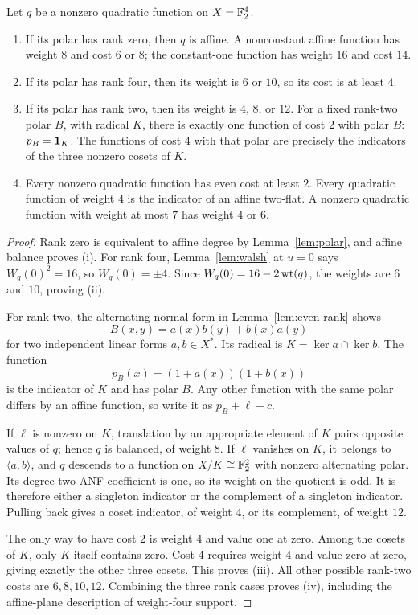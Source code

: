 \begin{lemma}\label{lem:four-costs}
Let $q$ be a nonzero quadratic function on $X=\mathbb F_2^4$.
\begin{enumerate}[label=(\roman*)]
\item If its polar has rank zero, then $q$ is affine. A nonconstant affine function has weight $8$ and cost $6$ or $8$; the constant-one function has weight $16$ and cost $14$.
\item If its polar has rank four, then its weight is $6$ or $10$, so its cost is at least $4$.
\item If its polar has rank two, then its weight is $4$, $8$, or $12$. For a fixed rank-two polar $B$, with radical $K$, there is exactly one function of cost $2$ with polar $B$: $p_B=\mathbf 1_K$. The functions of cost $4$ with that polar are precisely the indicators of the three nonzero cosets of $K$.
\item Every nonzero quadratic function has even cost at least $2$. Every quadratic function of weight $4$ is the indicator of an affine two-flat. A nonzero quadratic function with weight at most $7$ has weight $4$ or $6$.
\end{enumerate}
\end{lemma}
\begin{proof}
Rank zero is equivalent to affine degree by Lemma~\ref{lem:polar}, and affine balance proves (i). For rank four, Lemma~\ref{lem:walsh} at $u=0$ says $W_q(0)^2=16$, so $W_q(0)=\pm4$. Since $W_q(0)=16-2\operatorname{wt}(q)$, the weights are $6$ and $10$, proving (ii).

For rank two, the alternating normal form in Lemma~\ref{lem:even-rank} shows
\[
B(x,y)=a(x)b(y)+b(x)a(y)
\]
for two independent linear forms $a,b\in X^*$. Its radical is $K=\ker a\cap\ker b$. The function
\[
p_B(x)=(1+a(x))(1+b(x))
\]
is the indicator of $K$ and has polar $B$. Any other function with the same polar differs by an affine function, so write it as $p_B+\ell+c$.

If $\ell$ is nonzero on $K$, translation by an appropriate element of $K$ pairs opposite values of $q$; hence $q$ is balanced, of weight $8$. If $\ell$ vanishes on $K$, it belongs to $\langle a,b\rangle$, and $q$ descends to a function on $X/K\cong\mathbb F_2^2$ with nonzero alternating polar. Its degree-two ANF coefficient is one, so its weight on the quotient is odd. It is therefore either a singleton indicator or the complement of a singleton indicator. Pulling back gives a coset indicator, of weight $4$, or its complement, of weight $12$.

The only way to have cost $2$ is weight $4$ and value one at zero. Among the cosets of $K$, only $K$ itself contains zero. Cost $4$ requires weight $4$ and value zero at zero, giving exactly the other three cosets. This proves (iii). All other possible rank-two costs are $6,8,10,12$. Combining the three rank cases proves (iv), including the affine-plane description of weight-four support.
\end{proof}

